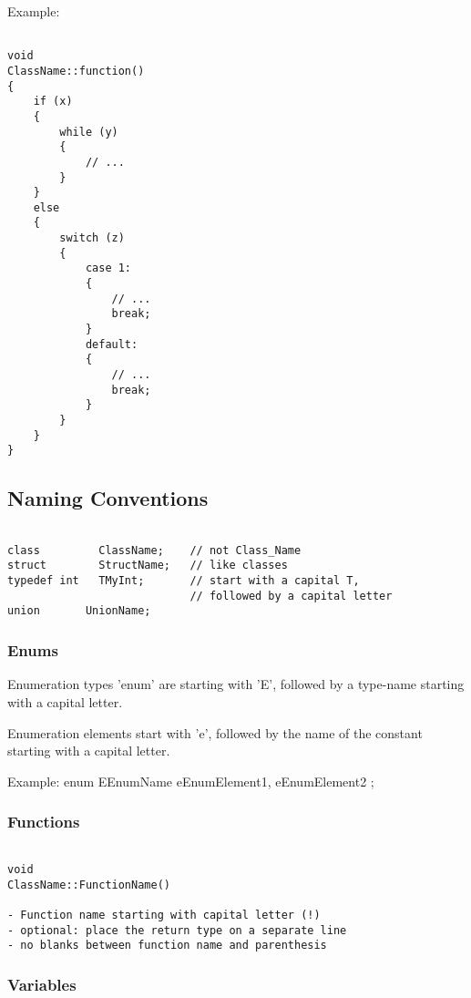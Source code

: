Example:
\begin{verbatim}

void
ClassName::function()
{
    if (x)
    {
        while (y)
        {
            // ...
        }
    }
    else
    {
        switch (z)
        {
            case 1:
            {
                // ...
                break;
            }
            default:
            {
                // ...
                break;
            }
        }
    }
}

\end{verbatim}
\subsection{Naming Conventions}

\begin{verbatim}

class         ClassName;    // not Class_Name 
struct        StructName;   // like classes
typedef int   TMyInt;       // start with a capital T, 
                            // followed by a capital letter
union		UnionName;    

\end{verbatim}

\subsubsection{Enums}

Enumeration types 'enum' are starting with 'E', followed by a type-name starting with a capital letter.

Enumeration elements start with 'e', followed by the name of the constant starting with a capital letter.

Example:
enum EEnumName
{
    eEnumElement1,
    eEnumElement2
};

\subsubsection{Functions}
\begin{verbatim}

void 
ClassName::FunctionName()

- Function name starting with capital letter (!)
- optional: place the return type on a separate line 
- no blanks between function name and parenthesis

\end{verbatim}
\subsubsection{Variables}

